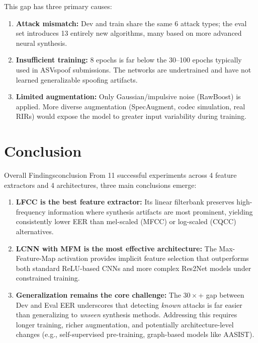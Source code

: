 \documentclass[12pt]{report}
\begin{document}
This gap has three primary causes:
\begin{enumerate}
    \item \textbf{Attack mismatch:} Dev and train share the same 6 attack types; the eval set
          introduces 13 entirely new algorithms, many based on more advanced neural synthesis.
    \item \textbf{Insufficient training:} 8 epochs is far below the 30--100 epochs typically
          used in ASVspoof submissions. The networks are undertrained and have not learned
          generalizable spoofing artifacts.
    \item \textbf{Limited augmentation:} Only Gaussian/impulsive noise (RawBoost) is applied.
          More diverse augmentation (SpecAugment, codec simulation, real RIRs) would expose
          the model to greater input variability during training.
\end{enumerate}

\section{Conclusion}

\begin{thmbox}{Overall Findings}{conclusion}
    From 11 successful experiments across 4 feature extractors and 4 architectures, three
    main conclusions emerge:

    \begin{enumerate}[noitemsep]
        \item \textbf{LFCC is the best feature extractor:} Its linear filterbank preserves
              high-frequency information where synthesis artifacts are most prominent, yielding
              consistently lower EER than mel-scaled (MFCC) or log-scaled (CQCC) alternatives.

        \item \textbf{LCNN with MFM is the most effective architecture:} The Max-Feature-Map
              activation provides implicit feature selection that outperforms both standard
              ReLU-based CNNs and more complex Res2Net models under constrained training.

        \item \textbf{Generalization remains the core challenge:} The $30\times$+ gap between
              Dev and Eval EER underscores that detecting \emph{known} attacks is far easier
              than generalizing to \emph{unseen} synthesis methods. Addressing this requires
              longer training, richer augmentation, and potentially architecture-level changes
              (e.g., self-supervised pre-training, graph-based models like AASIST).
    \end{enumerate}
\end{thmbox}
\end{document}
